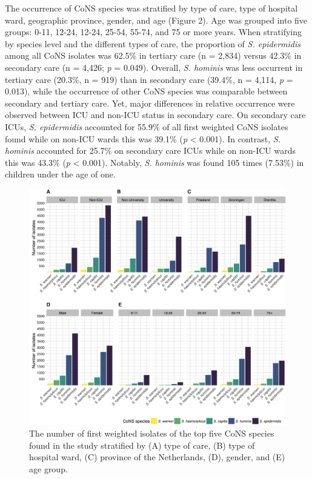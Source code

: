 \documentclass[
]{book}
\begin{document}
The occurrence of CoNS species was stratified by type of care, type of hospital ward, geographic province, gender, and age (Figure 2). Age was grouped into five groups: 0-11, 12-24, 12-24, 25-54, 55-74, and 75 or more years. When stratifying by species level and the different types of care, the proportion of \emph{S. epidermidis} among all CoNS isolates was 62.5\% in tertiary care (n = 2,834) versus 42.3\% in secondary care (n = 4,426; \emph{p} = 0.049). Overall, \emph{S. hominis} was less occurrent in tertiary care (20.3\%, n = 919) than in secondary care (39.4\%, n = 4,114, \emph{p} = 0.013), while the occurrence of other CoNS species was comparable between secondary and tertiary care. Yet, major differences in relative occurrence were observed between ICU and non-ICU status in secondary care. On secondary care ICUs, \emph{S. epidermidis} accounted for 55.9\% of all first weighted CoNS isolates found while on non-ICU wards this was 39.1\% (\emph{p} \textless{} 0.001). In contrast, \emph{S. hominis} accounted for 25.7\% on secondary care ICUs while on non-ICU wards this was 43.3\% (\emph{p} \textless{} 0.001). Notably, \emph{S. hominis} was found 105 times (7.53\%) in children under the age of one.

\begin{figure}

{\centering \includegraphics[width=1\linewidth]{images/07-02} 

}

\caption{The number of first weighted isolates of the top five CoNS species found in the study stratified by (A) type of care, (B) type of hospital ward, (C) province of the Netherlands, (D), gender, and (E) age group.}\label{fig:fig7-2}
\end{figure}
\end{document}
